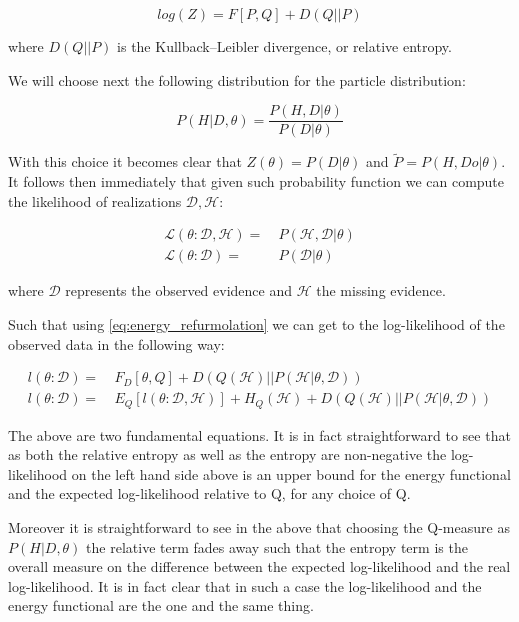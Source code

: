 \documentclass[11pt]{article}
\begin{document}
\begin{article}
\begin{equation} \label{eq:energy_refurmolation}
log (Z) = F[P, Q] + D (Q||P)
\end{equation}  

where \(D(Q||P)\) is the Kullback–Leibler divergence, or relative
entropy.

We will choose next the following distribution for the particle
distribution:

\begin{equation} \label{eq:particle_distribution}
P (H | D, \theta) =   \frac{P (H, D| \theta)}{P (D| \theta)}
\end{equation}

With this choice it becomes clear that \(Z (\theta) = P (D|
   \theta)\) and \(\tilde{P} = P (H, Do| \theta)\). It
follows then immediately that given such probability function we
can compute the likelihood of realizations \(\mathscr{D}, \mathscr{H}\):

\begin{align} \label{eq:likelihood_particle}
\mathscr{L} (\theta: \mathscr{D}, \mathscr{H}) =& \  P (\mathscr{H}, \mathscr{D}| \theta)\\
\mathscr{L} (\theta: \mathscr{D}) =& \ P (\mathscr{D}| \theta)
\end{align}

where \(\mathscr{D}\) represents the observed evidence and
\(\mathscr{H}\) the missing evidence.

Such that using \ref{eq:energy_refurmolation} we can get to the
log-likelihood of the observed data in the following way:

\begin{align} \label{eq:likelihood_energy_functional_relation}
l (\theta: \mathscr{D}) =& \  F_D[\theta, Q] + D (Q (\mathscr{H}) || P (\mathscr{H}| \theta, \mathscr{D})) \\
l (\theta: \mathscr{D}) =& \  E_Q[l (\theta: \mathscr{D}, \mathscr{H})]+ H_Q (\mathscr {H}) + D (Q (\mathscr{H}) || P (\mathscr{H}| \theta, \mathscr{D}))
\end{align}

The above are two fundamental equations. It is in fact
straightforward to see that as both the relative entropy as well as
the entropy are non-negative the log-likelihood on the left hand
side above is an upper bound for the energy functional and the expected
log-likelihood relative to Q, for any choice of Q.

Moreover it is straightforward to see in the above that choosing the
Q-measure as \(P (H| D, \theta)\) the relative term
fades away such that the entropy term is the overall measure on the
difference between the expected log-likelihood and the real
log-likelihood. It is in fact clear that in such a case the
log-likelihood and the energy functional are the one and the same
thing.


\end{article}
\end{document}
